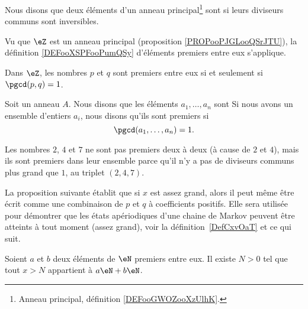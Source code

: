 \begin{definition}      \label{DEFooXSPFooPumQSy}
	Nous disons que deux éléments d'un anneau principal\footnote{Anneau principal, définition \ref{DEFooGWOZooXzUlhK}.} sont  si leurs diviseurs communs sont inversibles.
\end{definition}

Vu que \( \eZ\) est un anneau principal (proposition \ref{PROPooPJGLooQSrJTU}), la définition \ref{DEFooXSPFooPumQSy} d'éléments premiers entre eux s'applique.

\begin{lemma}       \label{LEMooLKLTooXUdsgB}
	Dans \( \eZ\), les nombres \( p\) et \( q\) sont premiers entre eux si et seulement si \( \pgcd(p,q)=1\).
\end{lemma}

\begin{definition}  \label{DefZHRXooNeWIcB}
	Soit un anneau \( A\). Nous disons que les éléments \( a_1,\ldots,a_n\) sont
	Si nous avons un ensemble d'entiers \( a_i\), nous disons qu'ils sont premiers  si
	\begin{equation}
		\pgcd(a_1,\ldots,a_n)=1.
	\end{equation}
\end{definition}

Les nombres \( 2\), \( 4\) et \( 7\) ne sont pas premiers deux à deux (à cause de \( 2\) et \( 4\)), mais ils sont premiers dans leur ensemble parce qu'il n'y a pas de diviseurs communs plus grand que \( 1\), au triplet \( (2, 4, 7)\).

La proposition suivante établit que si \( x\) est assez grand, alors il peut même être écrit comme une combinaison de \( p\) et \( q\) à coefficients positifs. Elle sera utilisée pour démontrer que les états apériodiques d'une chaine de Markov peuvent être atteints à tout moment (assez grand), voir la définition~\ref{DefCxvOaT} et ce qui suit.

\begin{proposition}     \label{PropLAbRSE}
	Soient \( a\) et \( b\) deux éléments de \( \eN\) premiers entre eux. Il existe \( N>0\) tel que tout \( x>N\) appartient à \( a\eN+b\eN\).
\end{proposition}


